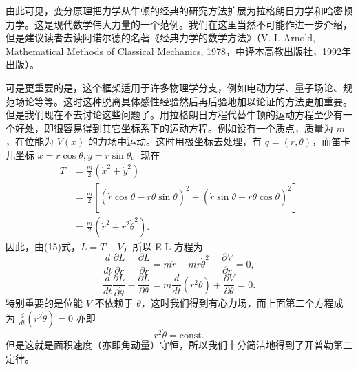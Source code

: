 由此可见，变分原理把力学从牛顿的经典的研究方法扩展为拉格朗日力学和哈密顿力学。这是现代数学伟大力量的一个范例。我们在这里当然不可能作进一步介绍，但是建议读者去读阿诺尔德的名著《经典力学的数学方法》（V. I. Arnold, Mathematical Methods of Classical Mechanics, 1978，中译本高教出版社，1992年出版）。

可是更重要的是，这个框架适用于许多物理学分支，例如电动力学、量子场论、规范场论等等。这时这种脱离具体感性经验然后再后验地加以论证的方法更加重要。但是我们现在不去讨论这些问题了。用拉格朗日方程代替牛顿的运动方程至少有一个好处，即很容易得到其它坐标系下的运动方程。例如设有一个质点，质量为 $m$，在位能为 $V(x)$ 的力场中运动。这时用极坐标去处理，有 $q=(r,\theta)$，而笛卡儿坐标 $x=r\cos\theta,y=r\sin\theta$。现在
\[
 \begin{aligned}
 T&=\frac m2(\dot x^2+\dot y^2)\\
 &=\frac m2\left[(\dot r\cos\theta-r\dot\theta\sin\theta)^2
 +(\dot r\sin\theta+r\dot\theta\cos\theta)^2\right]\\
 &=\frac m2(\dot r^2+r^2\dot\theta^2).
 \end{aligned}
\]
因此，由(15)式，$L=T-V$，所以 E-L 方程为
\[
 \frac d{dt}\frac{\partial L}{\partial\dot r}
 -\frac{\partial L}{\partial r}
 =m\ddot r-mr\dot\theta^2+\frac{\partial V}{\partial r}=0,
\]
\[
 \frac d{dt}\frac{\partial L}{\partial\dot\theta}
 -\frac{\partial L}{\partial\theta}
 =m\frac d{dt}(r^2\dot\theta)+\frac{\partial V}{\partial\theta}=0.
\]
特别重要的是位能 $V$ 不依赖于 $\theta$，这时我们得到有心力场，而上面第二个方程成为 $\frac d{dt}(r^2\dot\theta)=0$ 亦即
\[
 r^2\dot\theta=\mathrm{const.}
\]
但是这就是面积速度（亦即角动量）守恒，所以我们十分简洁地得到了开普勒第二定律。


